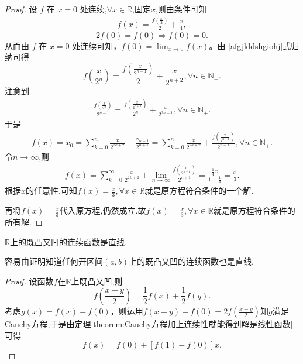 \documentclass[lang=cn,newtx,10pt,scheme=chinese]{elegantbook}
\begin{document}
\begin{proof}
设 \(f\) 在 \(x = 0\) 处连续,$\forall x\in \mathbb{R}$,固定$x$,则由条件可知
\begin{align}
f(x)=\frac{f\left(\frac{x}{2}\right)}{2}+\frac{x}{4}, \label{afgjkldshgiohj}
\end{align}
\[
2f(0)=f(0)\Rightarrow f(0)=0.
\]
从而由 \(f\) 在 \(x = 0\) 处连续可知，\(f(0)=\lim_{x\rightarrow 0}f(x)\)。由 \eqref{afgjkldshgiohj}式归纳可得
\[
f\left(\frac{x}{2^n}\right)=\frac{f\left(\frac{x}{2^{n + 1}}\right)}{2}+\frac{x}{2^{n + 2}},\forall n\in \mathbb{N}_+.
\]
\hyperlink{注意到的原因见笔记部分123}{注意到}
\begin{align*}
\frac{f\left( \frac{x}{2^n} \right)}{2^{n-1}}=\frac{f\left( \frac{x}{2^{n+1}} \right)}{2^n}+\frac{x}{2^{2n+1}},\forall n\in \mathbb{N} _+.
\end{align*}
于是
\begin{align*}
f\left( x \right) =x_0=\sum_{k=0}^n{\frac{x}{2^{2k+2}}}+\frac{x_{n+1}}{2^{n+1}}=\sum_{k=0}^n{\frac{x}{2^{2k+2}}}+\frac{f\left( \frac{x}{2^{n+1}} \right)}{2^{n+1}},\forall n\in \mathbb{N} _+.
\end{align*}
令$n\rightarrow \infty$,则
\begin{align*}
f\left( x \right) =\sum_{k=0}^{\infty}{\frac{x}{2^{2k+2}}}+\underset{n\rightarrow \infty}{\lim}\frac{f\left( \frac{x}{2^{n+1}} \right)}{2^{n+1}}=\frac{\frac{1}{4}x}{1-\frac{1}{4}}=\frac{x}{3}.
\end{align*}
根据$x$的任意性,可知$f(x)=\frac{x}{3},\forall x\in \mathbb{R}$就是原方程符合条件的一个解.

再将$f(x)=\frac{x}{3}$代入原方程,仍然成立.故$f(x)=\frac{x}{3},\forall x\in \mathbb{R}$就是原方程符合条件的所有解.
\end{proof}

\begin{example}\label{example:R上的既凸又凹的连续函数是直线}
\(\mathbb{R}\)上的既凸又凹的连续函数是直线.
\end{example}
\begin{note}
容易由证明知道任何开区间\((a,b)\)上的既凸又凹的连续函数也是直线.
\end{note}
\begin{proof}
设函数$f$在$\mathbb{R}$上既凸又凹,则
\[
f\left(\frac{x + y}{2}\right)=\frac{1}{2}f(x)+\frac{1}{2}f(y).
\]
考虑\(g(x)=f(x)-f(0)\)，则运用\(f(x + y)+f(0)=2f\left(\frac{x + y}{2}\right)\)知\(g\)满足Cauchy方程,于是由\hyperref[theorem:Cauchy方程加上连续性就能得到解是线性函数]{定理\ref{theorem:Cauchy方程加上连续性就能得到解是线性函数}}可得
\[
f(x)=f(0)+[f(1)-f(0)]x.
\]
\end{proof}
\end{document}
